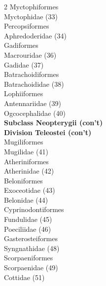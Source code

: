 \documentclass[12pt, hidelinks]{exam}
\newcommand{\onedent}{\hspace*{1em}}
\newcommand{\twodent}{\hspace*{2em}}
\begin{document}
\begin{multicols}{2}
\onedent Myctophiformes\\
\twodent Myctophidae (33)\\ 
\onedent Percopsiformes\\
\twodent Aphredoderidae (34)\\
\onedent Gadiformes\\
\twodent Macrouridae (36)\\
\twodent Gadidae (37)\\
\onedent Batrachoidiformes\\
\twodent Batrachoididae (38)\\
\onedent Lophiiformes\\
\twodent Antennariidae (39)\\
\twodent Ogcocephalidae (40)\\
\textbf{Subclass Neopterygii (con't)}\\
\hspace*{0.67em}\textbf{Division Teleostei (con't)}\\
\onedent Mugiliformes\\
\twodent Mugilidae (41)\\
\onedent Atheriniformes\\
\twodent Atherinidae (42)\\
\onedent Beloniformes\\
\twodent Exoceotidae (43)\\
\twodent Belonidae (44)\\
\onedent Cyprinodontiformes\\
\twodent Fundulidae (45)\\
\twodent Poeciliidae (46)\\
\onedent Gasterosteiformes\\
\twodent Syngnathidae (48)\\
\onedent Scorpaeniformes\\
\twodent Scorpaenidae (49)\\
\twodent Cottidae (51)\\


\end{multicols}
\end{document}
